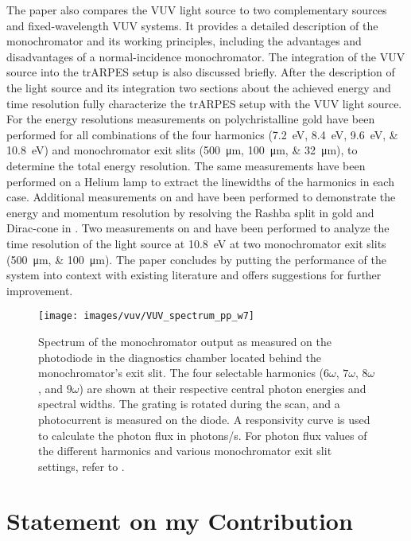 The paper also compares the VUV light source to two complementary sources and fixed-wavelength VUV systems.
It provides a detailed description of the monochromator and its working principles, including the advantages and disadvantages of a normal-incidence monochromator.
The integration of the VUV source into the trARPES setup is also discussed briefly.
After the description of the light source and its integration two sections about the achieved energy and time resolution fully characterize the trARPES setup with the VUV light source.
For the energy resolutions measurements on polychristalline gold have been performed for all combinations of the four harmonics (\qtylist{7.2;8.4;9.6;10.8}{\electronvolt}) and monochromator exit slits (\qtylist{500;100;32}{\micro\meter}), to determine the total energy resolution.
The same measurements have been performed on a Helium lamp to extract the linewidths of the harmonics in each case.
Additional measurements on  and  have been performed to demonstrate the energy and momentum resolution by resolving the Rashba split in gold and Dirac-cone in .
Two measurements on  and  have been performed to analyze the time resolution of the light source at \qty{10.8}{\electronvolt} at two monochromator exit slits (\qtylist{500;100}{\micro\meter}).
The paper concludes by putting the performance of the system into context with existing literature and offers suggestions for further improvement.

\begin{figure}[h!]
	\centering
	\texttt{[image: images/vuv/VUV\_spectrum\_pp\_w7]}
	\caption{Spectrum of the monochromator output as measured on the photodiode in the diagnostics chamber located behind the monochromator’s exit slit. The four selectable harmonics ($6\omega$, $7\omega$, $8\omega$, and $9\omega$) are shown at their respective central photon energies and spectral widths. The grating is rotated during the scan, and a photocurrent is measured on the diode. A responsivity curve is used to calculate the photon flux in photons/s. For photon flux values of the different harmonics and various monochromator exit slit settings, refer to \cite{hellbruck_high-resolution_2024}.}
	\label{fig:vuv_spectrum}
\end{figure}

\section*{Statement on my Contribution}

